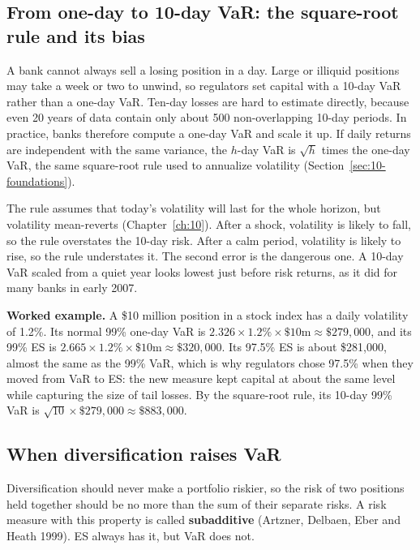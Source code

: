 \subsection{From one-day to 10-day VaR: the square-root rule and its bias}


A bank cannot always sell a losing position in a day. Large or illiquid positions may take a week or two to unwind, so regulators set capital with a 10-day VaR rather than a one-day VaR. Ten-day losses are hard to estimate directly, because even 20 years of data contain only about 500 non-overlapping 10-day periods. In practice, banks therefore compute a one-day VaR and scale it up. If daily returns are independent with the same variance, the $h$-day VaR is $\sqrt{h}$ times the one-day VaR, the same square-root rule used to annualize volatility (Section~\ref{sec:10-foundations}).

The rule assumes that today's volatility will last for the whole horizon, but volatility mean-reverts (Chapter~\ref{ch:10}). After a shock, volatility is likely to fall, so the rule overstates the 10-day risk. After a calm period, volatility is likely to rise, so the rule understates it. The second error is the dangerous one. A 10-day VaR scaled from a quiet year looks lowest just before risk returns, as it did for many banks in early 2007.

\textbf{Worked example.} A \$10 million position in a stock index has a daily volatility of 1.2\%. Its normal 99\% one-day VaR is $2.326 \times 1.2\% \times \$10\text{m} \approx \$279{,}000$, and its 99\% ES is $2.665 \times 1.2\% \times \$10\text{m} \approx \$320{,}000$. Its 97.5\% ES is about \$281{,}000, almost the same as the 99\% VaR, which is why regulators chose 97.5\% when they moved from VaR to ES: the new measure kept capital at about the same level while capturing the size of tail losses. By the square-root rule, its 10-day 99\% VaR is $\sqrt{10} \times \$279{,}000 \approx \$883{,}000$.

\subsection{When diversification raises VaR}

Diversification should never make a portfolio riskier, so the risk of two positions held together should be no more than the sum of their separate risks. A risk measure with this property is called \textbf{subadditive} (Artzner, Delbaen, Eber and Heath 1999). ES always has it, but VaR does not.

